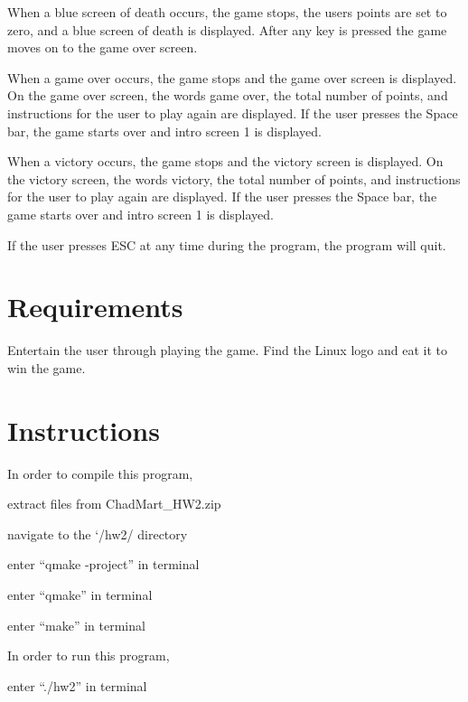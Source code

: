 \-When a blue screen of death occurs, the game stops, the users points are set to zero, and a blue screen of death is displayed. \-After any key is pressed the game moves on to the game over screen. 

\-When a game over occurs, the game stops and the game over screen is displayed. \-On the game over screen, the words game over, the total number of points, and instructions for the user to play again are displayed. \-If the user presses the \-Space bar, the game starts over and intro screen 1 is displayed. 

\-When a victory occurs, the game stops and the victory screen is displayed. \-On the victory screen, the words victory, the total number of points, and instructions for the user to play again are displayed. \-If the user presses the \-Space bar, the game starts over and intro screen 1 is displayed. 

\-If the user presses \-E\-S\-C at any time during the program, the program will quit.



 \hypertarget{index_Requirements}{}\section{\-Requirements}\label{index_Requirements}
\-Entertain the user through playing the game. \-Find the \-Linux logo and eat it to win the game.



 \hypertarget{index_Instructions}{}\section{\-Instructions}\label{index_Instructions}
\-In order to compile this program,
\begin{DoxyItemize}
\item extract files from \-Chad\-Mart\-\_\-\-H\-W2.\-zip
\item navigate to the `/hw2/ directory
\item enter “qmake -\/project” in terminal
\item enter “qmake” in terminal
\item enter “make” in terminal
\end{DoxyItemize}

\-In order to run this program,
\begin{DoxyItemize}
\item enter “./hw2” in terminal
\end{DoxyItemize}

